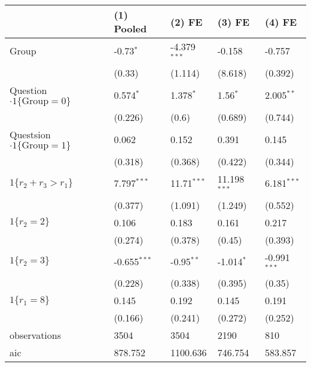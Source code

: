 \begin{tabular}{lllll}
\hline
 & (1) Pooled & (2) FE & (3) FE & (4) FE \\
\hline
Group & -0.73$^{*}$ & -4.379$^{***}$ & -0.158 & -0.757 \\
 & (0.33) & (1.114) & (8.618) & (0.392) \\
Question$\cdot1\{\text{Group}=0\}$ & 0.574$^{*}$ & 1.378$^{*}$ & 1.56$^{*}$ & 2.005$^{**}$ \\
 & (0.226) & (0.6) & (0.689) & (0.744) \\
Questsion$\cdot1\{\text{Group}=1\}$ & 0.062 & 0.152 & 0.391 & 0.145 \\
 & (0.318) & (0.368) & (0.422) & (0.344) \\
$1\{r_2 + r_3 > r_1\}$ & 7.797$^{***}$ & 11.71$^{***}$ & 11.198$^{***}$ & 6.181$^{***}$ \\
 & (0.377) & (1.091) & (1.249) & (0.552) \\
$1\{r_2 =2\}$ & 0.106 & 0.183 & 0.161 & 0.217 \\
 & (0.274) & (0.378) & (0.45) & (0.393) \\
$1\{r_2=3\}$ & -0.655$^{***}$ & -0.95$^{**}$ & -1.014$^{*}$ & -0.991$^{***}$ \\
 & (0.228) & (0.338) & (0.395) & (0.35) \\
$1\{r_1=8\}$ & 0.145 & 0.192 & 0.145 & 0.191 \\
 & (0.166) & (0.241) & (0.272) & (0.252) \\\hline

observations & 3504 & 3504 & 2190 & 810 \\
aic & 878.752 & 1100.636 & 746.754 & 583.857 \\
\hline
\end{tabular}
